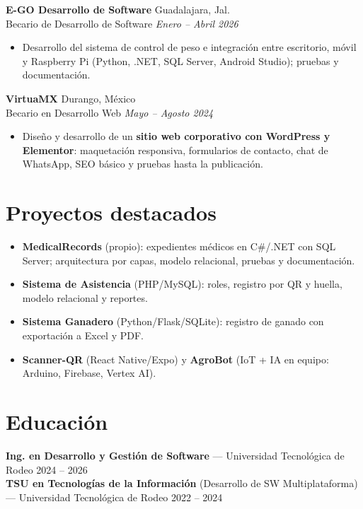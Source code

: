 \documentclass[10pt,a4paper]{article}
\newcommand{\entry}[4]{%
  \textbf{#1} \hfill {\color{muted}\small #2}\\[0pt]
  {\color{accent}\small #3} \hfill {\color{muted}\itshape\small #4}\\[1pt]
}
\begin{document}
\entry{E-GO Desarrollo de Software}{Guadalajara, Jal.}{Becario de Desarrollo de Software}{Enero -- Abril 2026}
\begin{itemize}
  \item Desarrollo del sistema de control de peso e integración entre escritorio, móvil y Raspberry Pi (Python, .NET, SQL Server, Android Studio); pruebas y documentación.
\end{itemize}

\entry{VirtuaMX}{Durango, México}{Becario en Desarrollo Web}{Mayo -- Agosto 2024}
\begin{itemize}
  \item Diseño y desarrollo de un \textbf{sitio web corporativo con WordPress y Elementor}: maquetación responsiva, formularios de contacto, chat de WhatsApp, SEO básico y pruebas hasta la publicación.
\end{itemize}

\section{Proyectos destacados}
\begin{itemize}
  \item \textbf{MedicalRecords} (propio): expedientes médicos en C\#/.NET con SQL Server; arquitectura por capas, modelo relacional, pruebas y documentación.
  \item \textbf{Sistema de Asistencia} (PHP/MySQL): roles, registro por QR y huella, modelo relacional y reportes.
  \item \textbf{Sistema Ganadero} (Python/Flask/SQLite): registro de ganado con exportación a Excel y PDF.
  \item \textbf{Scanner-QR} (React Native/Expo) y \textbf{AgroBot} (IoT + IA en equipo: Arduino, Firebase, Vertex AI).
\end{itemize}

\section{Educación}
\textbf{Ing. en Desarrollo y Gestión de Software} --- Universidad Tecnológica de Rodeo \hfill {\color{muted}\small 2024 -- 2026}\\[1pt]
\textbf{TSU en Tecnologías de la Información} (Desarrollo de SW Multiplataforma) --- Universidad Tecnológica de Rodeo \hfill {\color{muted}\small 2022 -- 2024}
\end{document}
